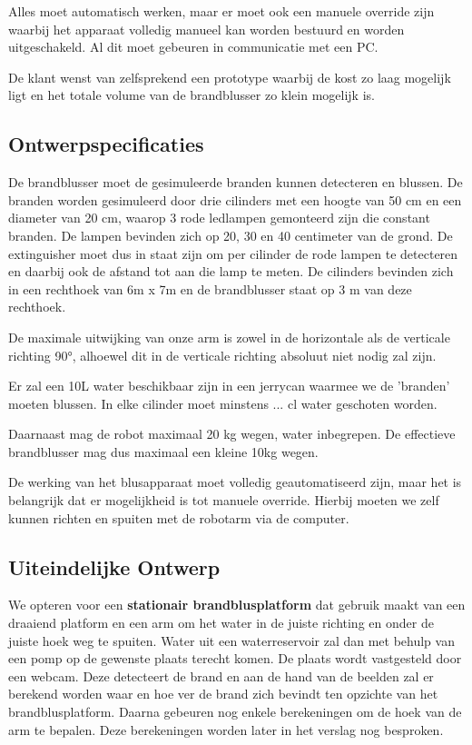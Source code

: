 \documentclass[kulak]{kulakarticle} %
\begin{document}
		Alles moet automatisch werken, maar er moet ook een manuele override zijn waarbij het apparaat volledig manueel kan worden bestuurd en worden uitgeschakeld. Al dit moet gebeuren in communicatie met een PC. 
		
		De klant wenst van zelfsprekend een prototype waarbij de kost zo laag mogelijk ligt en het totale volume van de brandblusser zo klein mogelijk is.



	\subsection{Ontwerpspecificaties}

		De brandblusser moet de gesimuleerde branden kunnen detecteren en blussen. De branden worden gesimuleerd door drie cilinders met een hoogte van 50 cm en een diameter van 20 cm, waarop 3 rode ledlampen gemonteerd zijn die constant branden. De lampen bevinden zich op 20, 30 en 40 centimeter van de grond. De extinguisher moet dus in staat zijn om per cilinder de rode lampen te detecteren en daarbij ook de afstand tot aan die lamp te meten. De cilinders bevinden zich in een rechthoek van 6m x 7m en de brandblusser staat op 3 m van deze rechthoek.
		
		De maximale uitwijking van onze arm is zowel in de horizontale als de verticale richting 90°, alhoewel dit in de verticale richting absoluut niet nodig zal zijn.
		
		Er zal een 10L water beschikbaar zijn in een jerrycan waarmee we de 'branden' moeten blussen. In elke cilinder moet minstens ... cl water geschoten worden.
		
		Daarnaast mag de robot maximaal 20 kg wegen, water inbegrepen. De effectieve brandblusser mag dus maximaal een kleine 10kg wegen.
		
		De werking van het blusapparaat moet volledig geautomatiseerd zijn, maar het is belangrijk dat er mogelijkheid is tot manuele override. Hierbij moeten we zelf kunnen richten en spuiten met de robotarm via de computer.
	

	\subsection{Uiteindelijke Ontwerp}

		We opteren voor een \textbf{stationair brandblusplatform} dat gebruik maakt van een draaiend platform en een arm om het water in de juiste richting en onder de juiste hoek weg te spuiten.  Water uit een waterreservoir zal dan met behulp van een pomp op de gewenste plaats terecht komen. De plaats wordt vastgesteld door een webcam. Deze detecteert de brand en aan de hand van de beelden zal er berekend worden waar en hoe ver de brand zich bevindt ten opzichte van het brandblusplatform. Daarna gebeuren nog enkele berekeningen om de hoek van de arm te bepalen. Deze berekeningen worden later in het verslag nog besproken. \\
		
\end{document}
